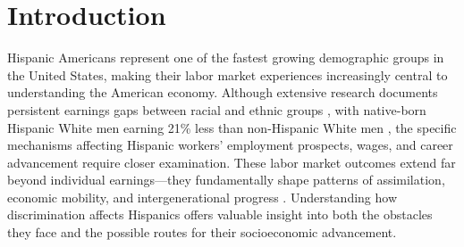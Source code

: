 
\section{Introduction}

Hispanic Americans represent one of the fastest growing demographic groups in the United States, making their labor market experiences increasingly central to understanding the American economy. Although extensive research documents persistent earnings gaps between racial and ethnic groups \autocite{bayer2018divergent, charles2008prejudice}, with native-born Hispanic White men earning 21\% less than non-Hispanic White men \autocite{duncan2006hispanics, duncan2018identifying, duncan2018socioeconomic}, the specific mechanisms affecting Hispanic workers' employment prospects, wages, and career advancement require closer examination. These labor market outcomes extend far beyond individual earnings—they fundamentally shape patterns of assimilation, economic mobility, and intergenerational progress \autocite{chettyUnitedStatesStill2014, chettyEffectsExposureBetter2016,chettyFadingAmericanDream2017}. Understanding how discrimination affects Hispanics offers valuable insight into both the obstacles they face and the possible routes for their socioeconomic advancement.


